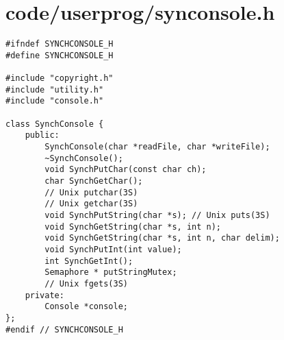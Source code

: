 \documentclass[a4paper,10pt]{article}
\begin{document}
\section{code/userprog/synconsole.h}
\begin{lstlisting}
#ifndef SYNCHCONSOLE_H
#define SYNCHCONSOLE_H

#include "copyright.h"
#include "utility.h"
#include "console.h"

class SynchConsole {
    public:
        SynchConsole(char *readFile, char *writeFile);
        ~SynchConsole();
        void SynchPutChar(const char ch);
        char SynchGetChar();
        // Unix putchar(3S)
        // Unix getchar(3S)
        void SynchPutString(char *s); // Unix puts(3S)
        void SynchGetString(char *s, int n);
        void SynchGetString(char *s, int n, char delim);
        void SynchPutInt(int value);
        int SynchGetInt();
        Semaphore * putStringMutex;
        // Unix fgets(3S)
    private:
        Console *console;
};
#endif // SYNCHCONSOLE_H

\end{lstlisting}
\end{document}
